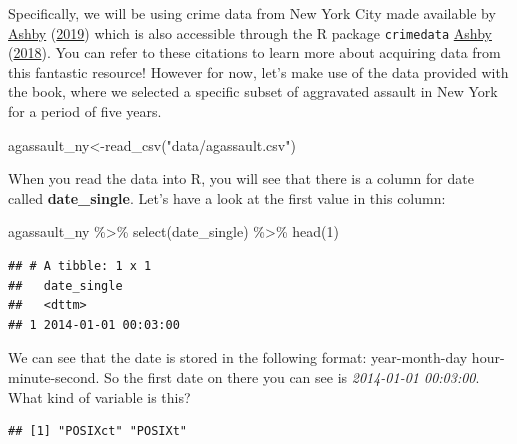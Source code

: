 \documentclass[
  krantz2]{krantz}
\makeatletter
\newenvironment{Shaded}{\begin{snugshade}}{\end{snugshade}}
\newcommand{\DecValTok}[1]{\textcolor[rgb]{0.06,0.06,0.06}{#1}}
\newcommand{\FunctionTok}[1]{\textcolor[rgb]{0,0,0}{#1}}
\newcommand{\NormalTok}[1]{#1}
\newcommand{\OtherTok}[1]{\textcolor[rgb]{0.37,0.37,0.37}{#1}}
\newcommand{\SpecialCharTok}[1]{\textcolor[rgb]{0,0,0}{#1}}
\newcommand{\StringTok}[1]{\textcolor[rgb]{0.5,0.5,0.5}{#1}}
\newenvironment{kframe}{%
\medskip{}
\setlength{\fboxsep}{.8em}
 \def\at@end@of@kframe{}%
 \ifinner\ifhmode%
  \def\at@end@of@kframe{\end{minipage}}%
  \begin{minipage}{\columnwidth}%
 \fi\fi%
 \def\FrameCommand##1{\hskip\@totalleftmargin \hskip-\fboxsep
 \colorbox{shadecolor}{##1}\hskip-\fboxsep
     \hskip-\linewidth \hskip-\@totalleftmargin \hskip\columnwidth}%
 \MakeFramed {\advance\hsize-\width
   \@totalleftmargin\z@ \linewidth\hsize
   \@setminipage}}%
 {\par\unskip\endMakeFramed%
 \at@end@of@kframe}
\renewenvironment{Shaded}{\begin{kframe}}{\end{kframe}}
\makeatother
\begin{document}
Specifically, we will be using crime data from New York City made available by \protect\hyperlink{ref-Ashby_2019}{Ashby} (\protect\hyperlink{ref-Ashby_2019}{2019}) which is also accessible through the R package \texttt{crimedata} \protect\hyperlink{ref-Ashby_2018}{Ashby} (\protect\hyperlink{ref-Ashby_2018}{2018}). You can refer to these citations to learn more about acquiring data from this fantastic resource! However for now, let's make use of the data provided with the book, where we selected a specific subset of aggravated assault in New York for a period of five years.

\begin{Shaded}
\begin{Highlighting}[]
\NormalTok{agassault\_ny}\OtherTok{\textless{}{-}}\FunctionTok{read\_csv}\NormalTok{(}\StringTok{"data/agassault.csv"}\NormalTok{)}
\end{Highlighting}
\end{Shaded}

When you read the data into R, you will see that there is a column for date called \textbf{date\_single}. Let's have a look at the first value in this column:

\begin{Shaded}
\begin{Highlighting}[]
\NormalTok{agassault\_ny }\SpecialCharTok{\%\textgreater{}\%} 
  \FunctionTok{select}\NormalTok{(date\_single) }\SpecialCharTok{\%\textgreater{}\%} 
  \FunctionTok{head}\NormalTok{(}\DecValTok{1}\NormalTok{)}
\end{Highlighting}
\end{Shaded}

\begin{verbatim}
## # A tibble: 1 x 1
##   date_single        
##   <dttm>             
## 1 2014-01-01 00:03:00
\end{verbatim}

We can see that the date is stored in the following format: year-month-day hour-minute-second. So the first date on there you can see is \emph{2014-01-01 00:03:00}. What kind of variable is this?

\begin{Shaded}
\end{Shaded}

\begin{verbatim}
## [1] "POSIXct" "POSIXt"
\end{verbatim}
\end{document}
